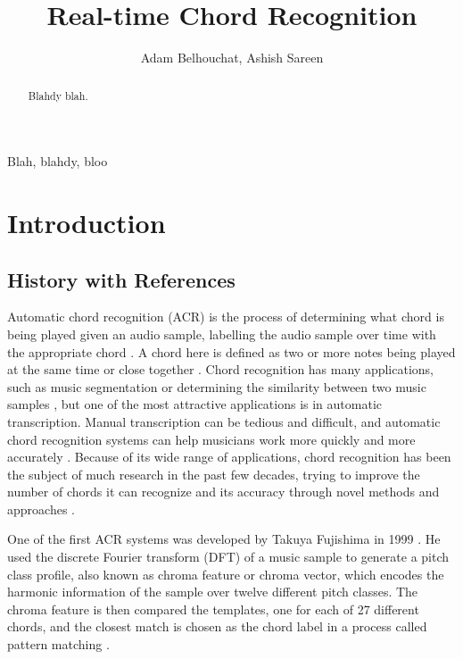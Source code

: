 \documentclass[journal]{IEEEtran}
\begin{document}
\title{Real-time Chord Recognition}
\author{Adam Belhouchat, Ashish Sareen}
\maketitle

\begin{abstract}
    Blahdy blah.
\end{abstract}
\begin{IEEEkeywords}
    Blah, blahdy, bloo
\end{IEEEkeywords}

\section{Introduction}
\subsection{History with References}
Automatic chord recognition (ACR) is the process of determining what chord is being played given an audio sample, labelling the audio sample over time with the appropriate chord \cite{stark}.
A chord here is defined as two or more notes being played at the same time or close together \cite{cho}.
Chord recognition has many applications, such as music segmentation or determining the similarity between two music samples \cite{lee}, but one of the most attractive applications is in automatic transcription.
Manual transcription can be tedious and difficult, and automatic chord recognition systems can help musicians work more quickly and more accurately \cite{mauch_thesis}.
Because of its wide range of applications, chord recognition has been the subject of much research in the past few decades, trying to improve the number of chords it can recognize and its accuracy through novel methods and approaches \cite{pauwels}.

One of the first ACR systems was developed by Takuya Fujishima in 1999 \cite{pauwels}.
He used the discrete Fourier transform (DFT) of a music sample to generate a pitch class profile, also known as chroma feature or chroma vector, which encodes the harmonic information of the sample over twelve different pitch classes.
The chroma feature is then compared the templates, one for each of 27 different chords, and the closest match is chosen as the chord label in a process called pattern matching \cite{fujishima}.
\end{document}
